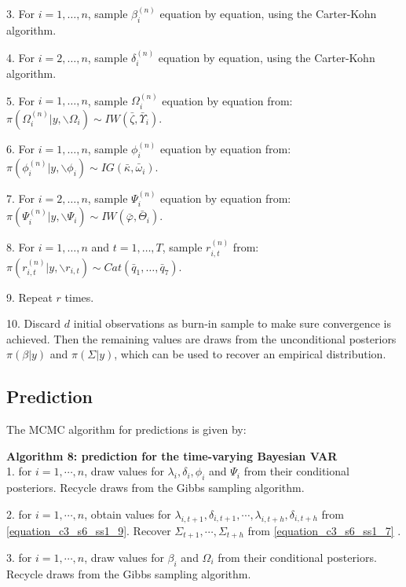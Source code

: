 3. For $i=1, \ldots, n$, sample $\beta_i^{(n)}$ equation by equation, using the Carter-Kohn algorithm.

4. For $i=2, \ldots, n$, sample  $\delta_i^{(n)}$ equation by equation, using the Carter-Kohn algorithm.

5. For $i=1, \ldots, n$, sample $\Omega_i^{(n)}$ equation by equation from: $\pi(\Omega_i^{(n)} |y, \backslash \Omega_i) \sim IW (\bar{\zeta},\bar{\Upsilon}_i)$.

6. For $i=1, \ldots, n$, sample $\phi_i^{(n)}$ equation by equation from: $\pi(\phi_i^{(n)} |y, \backslash \phi_i) \sim IG(\bar{\kappa},\bar{\omega}_i)$.

7. For $i=2, \ldots, n$, sample $\Psi_i^{(n)}$ equation by equation from: $\pi(\Psi_i^{(n)} |y, \backslash \Psi_i) \sim IW (\bar{\varphi},\bar{\Theta}_i)$.

8. For $i=1, \ldots, n$ and $t=1,\ldots,T$, sample $r_{i,t}^{(n)}$ from: $\pi(r_{i,t}^{(n)}|y, \backslash r_{i,t}) \sim Cat(\bar{q}_1,\ldots,\bar{q}_7)$.

9. Repeat $r$ times.

10. Discard $d$ initial observations as burn-in sample to make sure convergence is achieved. Then the remaining values are draws from the unconditional posteriors $\pi(\beta| y)$ and $\pi(\Sigma| y)$, which can be used to recover an empirical distribution.

\newpage

\subsection{Prediction}
\label{chapter3_section6_subsection3}


The MCMC algorithm for predictions is given by:

\textbf{Algorithm 8: prediction for the time-varying Bayesian VAR} \vspace{3mm} \\
1. for $i=1,\cdots, n$, draw values for $\lambda_i, \delta_i, \phi_i$ and $\Psi_i$ from their conditional posteriors. Recycle draws from the Gibbs sampling algorithm.

2. for $i=1,\cdots, n$, obtain values for $\lambda_{i,t+1}, \delta_{i,t+1}, \cdots, \lambda_{i,t+h}, \delta_{i,t+h}$ from \ref{equation_c3_s6_ss1_9}. Recover $\Sigma_{t+1}, \cdots, \Sigma_{t+h}$ from \ref{equation_c3_s6_ss1_7} .

3. for $i=1,\cdots, n$, draw values for $\beta_i$ and $\Omega_i$ from their conditional posteriors. Recycle draws from the Gibbs sampling algorithm.

